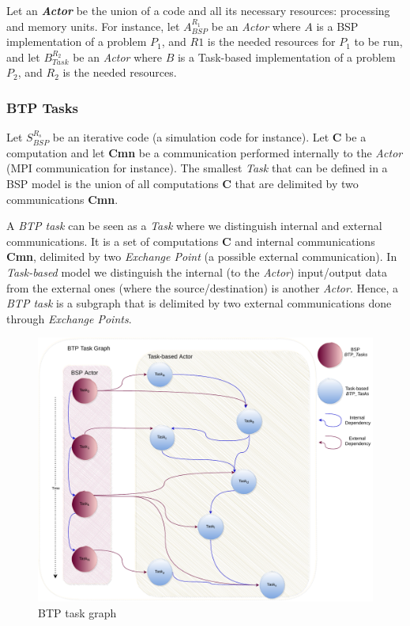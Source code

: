 Let an \textbf{\textit{Actor}} be the union of a code and all its necessary resources: processing and memory units.   
For instance, let $A_{BSP}^{R_{1}}$ be an \textit{Actor} where $A$ is a BSP implementation of a problem $P_{1}$, and $R1$ is the needed resources for $P_{1}$ to be run, and let $B_{Task}^{R_{2}}$ be an \textit{Actor} where $B$ is a Task-based implementation of a problem $P_{2}$, and $R_{2}$ is the needed resources.

\subsubsection{BTP Tasks}\label{btptask}
Let $S_{BSP}^{R_{s}}$ be an iterative code (a simulation code for instance). Let \textbf{C} be a computation and let \textbf{Cmn} be a communication performed internally to the \textit{Actor} (MPI communication for instance). The smallest \textit{Task} that can be defined in a BSP model is the union of all computations \textbf{C} that are delimited by two communications \textbf{Cmn}. 

A \textit{BTP task} can be seen as a \textit{Task} where we distinguish internal and external communications. It is a set of computations \textbf{C} and internal communications \textbf{Cmn}, delimited by two \textit{Exchange Point} (a possible external communication). In \textit{Task-based} model we distinguish the internal (to the \textit{Actor}) input/output data from the external ones (where the source/destination) is another \textit{Actor}. Hence, a \textit{BTP task} is a subgraph that is delimited by two external communications done through \textit{Exchange Points}.


\begin{figure}[tb]\centering
\includegraphics[width=0.75\columnwidth]{figures/BTPTaskGraph.pdf}
\caption{BTP task graph}
\label{figWUG}
\end{figure}

